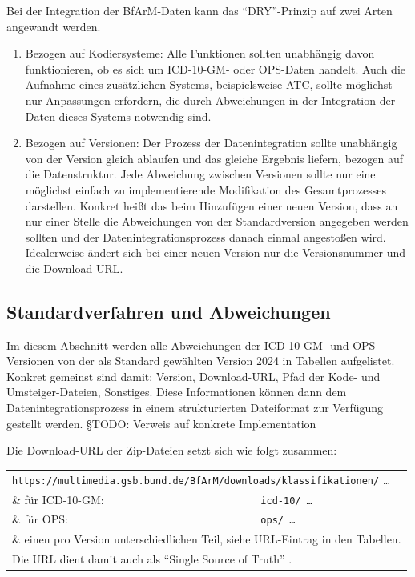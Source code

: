\newpage %

Bei der Integration der BfArM-Daten kann das ``DRY''-Prinzip auf zwei Arten angewandt werden.

\begin{enumerate}
\item Bezogen auf Kodiersysteme: Alle Funktionen sollten unabhängig davon funktionieren, ob es sich um ICD-10-GM- oder OPS-Daten handelt. Auch die Aufnahme eines zusätzlichen Systems, beispielsweise ATC, sollte möglichst nur Anpassungen erfordern, die durch Abweichungen in der Integration der Daten dieses Systems notwendig sind. 
\item Bezogen auf Versionen: Der Prozess der Datenintegration sollte unabhängig von der Version gleich ablaufen und das gleiche Ergebnis liefern, bezogen auf die Datenstruktur. Jede Abweichung zwischen Versionen sollte nur eine möglichst einfach zu implementierende Modifikation des Gesamtprozesses darstellen. Konkret heißt das beim Hinzufügen einer neuen Version, dass an nur einer Stelle die Abweichungen von der Standardversion angegeben werden sollten und der Datenintegrationsprozess danach einmal angestoßen wird. Idealerweise ändert sich bei einer neuen Version nur die Versionsnummer und die Download-URL. 
\end{enumerate}

\subsection{Standardverfahren und Abweichungen}

Im diesem Abschnitt werden alle Abweichungen der ICD-10-GM- und OPS-Versionen von der als Standard gewählten Version 2024 in Tabellen aufgelistet. Konkret gemeinst sind damit: Version, Download-URL, Pfad der Kode- und Umsteiger-Dateien, Sonstiges. Diese Informationen können dann dem Datenintegrationsprozess in einem strukturierten Dateiformat zur Verfügung gestellt werden. {\color{blue} §TODO: Verweis auf konkrete Implementation}

Die Download-URL der Zip-Dateien setzt sich wie folgt zusammen:

\begingroup
\renewcommand{\arraystretch}{1.0}
\begin{tabular}{p{4cm}l}
\multicolumn{2}{l}{\texttt{https://multimedia.gsb.bund.de/BfArM/downloads/klassifikationen/} \ldots} \\
\& für ICD-10-GM: & \texttt{icd-10/ \ldots} \\
\& für OPS: & \texttt{ops/ \ldots} \\
\multicolumn{2}{l}{\& einen pro Version unterschiedlichen Teil, siehe URL-Eintrag in den Tabellen.} \\
\multicolumn{2}{l}{Die URL dient damit auch als ``Single Source of Truth'' \citep[Seite 257]{bonnefoy2024definitive}.} \\
\end{tabular}
\endgroup \\

